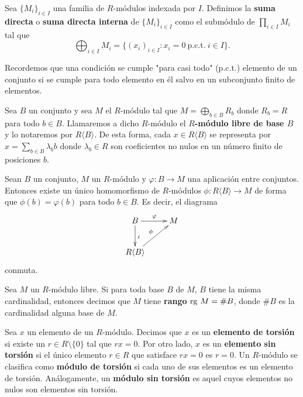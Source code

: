 \begin{definicion}
	Sea \(\{M_{i}\}_{i \in I}\) una familia de \(R\)-módulos indexada por \(I\).
	Definimos la \textbf{suma directa} o \textbf{suma directa interna} de
	\(\{M_{i}\}_{i \in I}\) como el submódulo de \(\prod_{i \in I}M_{i}\) tal que
	\[
	\bigoplus_{i \in I}M_{i}= \{(x_{i})_{i \in I}: x_{i}= 0 \ \text{p.c.t.}\ i \in
	I\}.
	\]
\end{definicion}
\begin{nota}
	Recordemos que una condición se cumple "para casi todo" (p.c.t.) elemento de
	un conjunto si se cumple para todo elemento en él salvo en un subconjunto
	finito de elementos.
\end{nota}
\begin{definicion}
	Sea \(B\) un conjunto y sea \(M\) el \(R\)-módulo tal que \(M = \bigoplus_{b \in B}R_{b}\)
	donde \(R_{b}=R\) para todo \(b \in B\). Llamaremos a dicho \(R\)-módulo el \textbf{\(R\)-módulo
		libre de base \(B\)} y lo notaremos por \(R \langle B \rangle\). De esta forma, cada
	\(x \in R \langle B \rangle\) se representa por \(x = \sum_{b\in B}\lambda_{b} b\) donde \(\lambda_{b}\in R\) son coeficientes no nulos en un número finito de posiciones
	\(b\).
\end{definicion}

\begin{teorema}
	 \label{teo:univ-prop-free-mod} Sean
	\(B\) un conjunto, \(M\) un \(R\)-módulo y \(\varphi : B \to M\) una aplicación entre
	conjuntos. Entonces existe un único homomorfismo de \(R\)-módulos \(\phi : R \langle
	B \rangle \to M\) de forma que \(\phi(b) = \varphi(b)\) para todo \(b \in B\). Es
	decir, el diagrama
	\[
	\xymatrix{ B \ar@{->}[r]^{\varphi} \ar@{->}[d]^{i} & M \\ R \langle B \rangle \ar@{->}[ru]^{\phi} & }
	\]
	conmuta.
\end{teorema}

\begin{definicion}
	Sea \(M\) un \(R\)-módulo libre. Si para toda base \(B\) de \(M\), \(B\) tiene la misma cardinalidad,
	entonces decimos que \(M\) tiene \textbf{rango} \(\operatorname{rg} \, M = \# B\), donde \(\# B\)
	es la cardinalidad alguna base de \(M\).
\end{definicion}
\begin{definicion}
	Sea \(x\) un elemento de un \(R\)-módulo. Decimos que \(x\) es un\textbf{ elemento de
		torsión} si existe un \(r \in R \setminus \{0\}\) tal que \(rx = 0\). Por otro lado,
	\(x\) es un \textbf{elemento sin torsión} si el único elemento \(r \in R\) que satisface
	\(rx = 0\) es \(r = 0\). Un \(R\)-módulo se clasifica como \textbf{módulo de torsión}
	si cada uno de sus elementos es un elemento de torsión. Análogamente, un \textbf{módulo
		sin torsión} es aquel cuyos elementos no nulos son elementos sin torsión.
\end{definicion}

